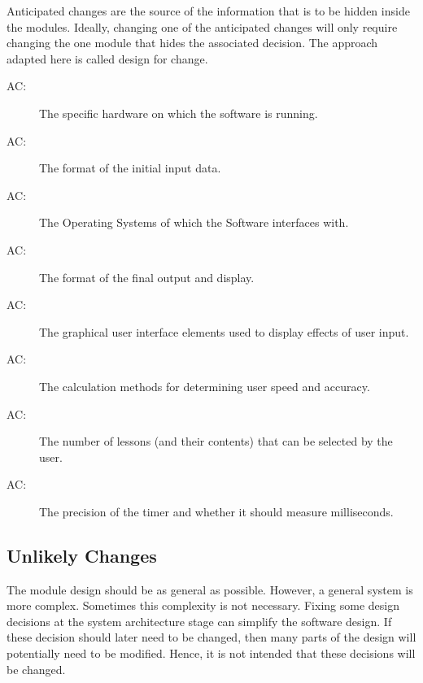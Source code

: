 \documentclass[12pt, titlepage]{article}
\newcounter{acnum}
\newcommand{\actheacnum}{AC\theacnum}
\begin{document}
Anticipated changes are the source of the information that is to be hidden
inside the modules. Ideally, changing one of the anticipated changes will only
require changing the one module that hides the associated decision. The approach
adapted here is called design for
change.

\begin{description}
\item[ \actheacnum \label{acHardware}:] The specific hardware on which the software is running.
\item[ \actheacnum \label{acInput}:] The format of the initial input data.
\item[ \actheacnum \label{acInput}:] The Operating Systems of which the Software interfaces with.
 \item[ \actheacnum \label{acInput}:] The format of the final output and display.
 \item[ \actheacnum \label{acInput}:] The graphical user interface elements used to display effects of user input.
 \item[ \actheacnum \label{acInput}:] The calculation methods for determining user speed and accuracy.
  \item[ \actheacnum \label{acInput}:] The number of lessons (and their contents) that can be selected by the user.
   \item[ \actheacnum \label{acInput}:] The precision of the timer and whether it should measure milliseconds.
\end{description}

\subsection{Unlikely Changes} \label{SecUchange}

The module design should be as general as possible. However, a general system is
more complex. Sometimes this complexity is not necessary. Fixing some design
decisions at the system architecture stage can simplify the software design. If
these decision should later need to be changed, then many parts of the design
will potentially need to be modified. Hence, it is not intended that these
decisions will be changed.
\end{document}

